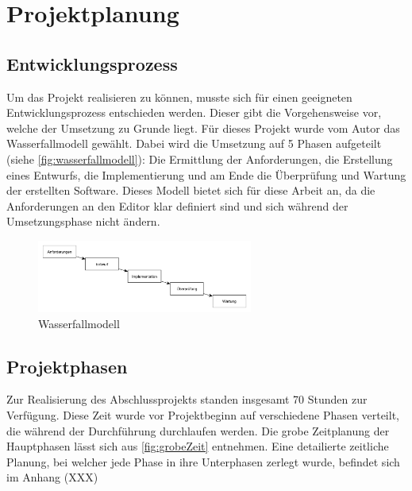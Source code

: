 \section{Projektplanung}

\subsection{Entwicklungsprozess}

Um das Projekt realisieren zu können, musste sich für einen geeigneten Entwicklungsprozess entschieden werden. Dieser gibt die Vorgehensweise vor, welche der Umsetzung zu Grunde liegt. Für dieses Projekt wurde vom Autor das Wasserfallmodell gewählt. Dabei wird die Umsetzung auf 5 Phasen aufgeteilt (siehe \autoref{fig:wasserfallmodell}): Die Ermittlung der Anforderungen, die Erstellung eines Entwurfs, die Implementierung und am Ende die Überprüfung und Wartung der erstellten Software. Dieses Modell bietet sich für diese Arbeit an, da die Anforderungen an den Editor klar definiert sind und sich während der Umsetzungsphase nicht ändern.

\begin{figure}[H]
	\centering
	\includegraphics[height=90px]{../img/diagram/Wasserfallmodell}
	\caption{Wasserfallmodell}
	\label{fig:wasserfallmodell}
\end{figure}

\subsection{Projektphasen}

Zur Realisierung des Abschlussprojekts standen insgesamt 70 Stunden zur Verfügung. Diese Zeit wurde vor Projektbeginn auf verschiedene Phasen verteilt, die während der Durchführung durchlaufen werden. Die grobe Zeitplanung der Hauptphasen lässt sich aus \autoref{fig:grobeZeit} entnehmen. Eine detailierte zeitliche Planung, bei welcher jede Phase in ihre Unterphasen zerlegt wurde, befindet sich im Anhang (XXX)

